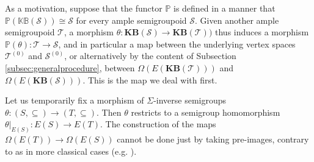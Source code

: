 As a motivation, suppose that the functor $\mathbb{P}$ is defined in a manner that $\mathbb{P}(\mathbb{KB}(\mathcal{S}))\cong\mathcal{S}$ for every ample semigroupoid $\mathcal{S}$. Given another ample semigroupoid $\mathcal{T}$, a morphism $\theta\colon\mathbf{KB}(\mathcal{S})\to\mathbf{KB}(\mathcal{T}))$ thus induces a morphism $\mathbb{P}(\theta)\colon\mathcal{T}\to\mathcal{S}$, and in particular a map between the underlying vertex spaces $\mathcal{T}^{(0)}$ and $\mathcal{S}^{(0)}$, or alternatively by the content of Subsection \ref{subsec:generalprocedure}, between $\Omega(E(\mathbf{KB}(\mathcal{T})))$ and $\Omega(E(\mathbf{KB}(\mathcal{S})))$. This is the map we deal with first.

Let us temporarily fix a morphism of $\Sigma$-inverse semigroups $\theta\colon(S,\subseteq)\to(T,\subseteq)$. Then $\theta$ restricts to a semigroup homomorphism $\theta|_{E(S)}\colon E(S)\to E(T)$. The construction of the maps $\Omega(E(T))\to\Omega(E(S))$ cannot be done just by taking pre-images, contrary to as in more classical cases (e.g. \cite{MR3077869}).


